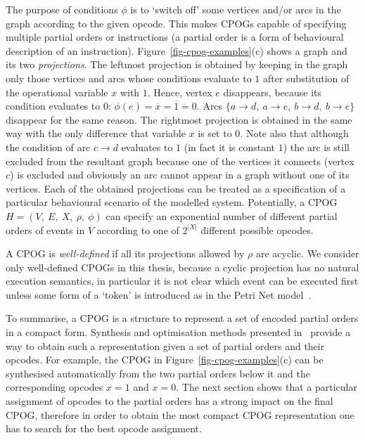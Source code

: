 The purpose of conditions $\phi$ is to `switch off' some vertices
and/or arcs in the graph according to the given opcode. This makes
CPOGs capable of specifying multiple partial orders or instructions
(a partial order is a form of behavioural description of an instruction).
Figure~\ref{fig-cpog-examples}(c) shows a graph and its two \emph{projections}.
The leftmost projection is obtained by keeping in the graph only those
vertices and arcs whose conditions evaluate to $1$ after substitution
of the operational variable $x$ with $1$. Hence, vertex $e$ disappears,
because its condition evaluates to $0$: $\phi(e)=\overline{x}=\overline{1}=0$.
Arcs $\{a\rightarrow d,\ a\rightarrow e,\ b\rightarrow d,\ b\rightarrow e\}$
disappear for the same reason. The rightmost projection is obtained
in the same way with the only difference that variable $x$ is set
to $0$. Note also that although the condition of arc $c\rightarrow d$
evaluates to $1$ (in fact it is constant $1$) the arc is still excluded
from the resultant graph because one of the vertices it connects (vertex
$c$) is excluded and obviously an arc cannot appear in a graph without
one of its vertices. Each of the obtained projections can be treated
as a specification of a particular behavioural scenario of the modelled
system. Potentially, a CPOG $H=(V,\ E,\ X,\ \rho,\ \phi)$ can specify
an exponential number of different partial orders of events in $V$
according to one of $2^{|X|}$ different possible opcodes.

A CPOG is \emph{well-defined} if all its projections allowed by
$\rho$ are acyclic. We consider only well-defined CPOGs in this thesis,
because a cyclic projection has no natural execution semantics, in
particular it is not clear which event can be executed first unless
some form of a \textquoteleft{}token\textquoteright{} is introduced
as in the Petri Net model~\cite{2002_cortadella_book}.

To summarise, a CPOG is a structure to represent a set of encoded
partial orders in a compact form. Synthesis and optimisation methods
presented in~\cite{2010_mokhov_ieee} provide a way to obtain such
a representation given a set of partial orders and their opcodes.
For example, the CPOG in Figure~\ref{fig-cpog-examples}(c) can be
synthesised automatically from the two partial orders below it and
the corresponding opcodes $x=1$ and $x=0$. The next section shows
that a particular assignment of opcodes to the partial orders has
a strong impact on the final CPOG, therefore in order to obtain the
most compact CPOG representation one has to search for the best opcode
assignment.

